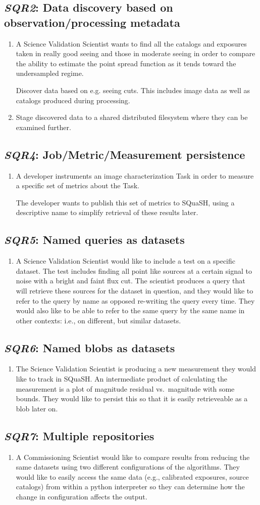 \documentclass[DM,toc,lsstdraft]{lsstdoc}
\newcommand{\usecase}[3]{%
\subsection{\emph{#1}: #2}
\label{use:#1}
\begin{enumerate}[label=\alph*.]
#3
\end{enumerate}
}
\begin{document}
\usecase{SQR2}{Data discovery based on observation/processing metadata}{%

\item
A Science Validation Scientist wants to find all the catalogs and exposures taken in really good seeing and those in moderate seeing in order to compare the ability to estimate the point spread function as it tends toward the undersampled regime.

Discover data based on e.g. seeing cuts.
This includes image data as well as catalogs produced during processing.

\item
Stage discovered data to a shared distributed filesystem where they can be examined further.

}

\usecase{SQR4}{Job/Metric/Measurement persistence}{%

\item
A developer instruments an image characterization Task in order to measure a specific set of metrics about the Task.

The developer wants to publish this set of metrics to SQuaSH, using a descriptive name to simplify retrieval of these results later.

}

\usecase{SQR5}{Named queries as datasets}{%

\item
A Science Validation Scientist would like to include a test on a specific dataset.
The test includes finding all point like sources at a certain signal to noise with a bright and faint flux cut.
The scientist produces a query that will retrieve these sources for the dataset in question, and they would like to refer to the query by name as opposed re-writing the query every time.
They would also like to be able to refer to the same query by the same name in other contexts: i.e., on different, but similar datasets.

}

\usecase{SQR6}{Named blobs as datasets}{%

\item
The Science Validation Scientist is producing a new measurement they would like to track in SQuaSH.
An intermediate product of calculating the measurement is a plot of magnitude residual vs.\ magnitude with some bounds.
They would like to persist this so that it is easily retrieveable as a blob later on.

}

\usecase{SQR7}{Multiple repositories}{%

\item
A Commissioning Scientist would like to compare results from reducing the same datasets using two different configurations of the algorithms.
They would like to easily access the same data (e.g., calibrated exposures, source catalogs) from within a python interpreter so they can determine how the change in configuration affects the output.

}
\end{document}
